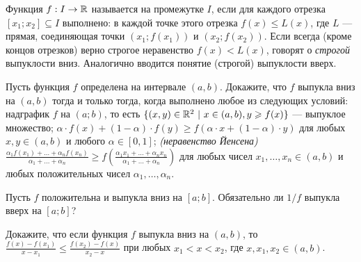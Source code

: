 \documentclass[a4paper, 12pt]{article}
\newcommand{\0}[1]{\overline{#1}}
\begin{document}






 Функция $f:I\rightarrow\mathbb{R}$
называется  на промежутке $I$, если для каждого отрезка
$[x_1;x_2]\subseteq I$ выполнено: в каждой точке этого отрезка $f(x)\leqslant L(x)$, где $L$ --- прямая,
соединяющая точки $(x_1;f(x_1))$ и $(x_2;f(x_2))$.
Если всегда (кроме концов отрезков) верно строгое неравенство $f(x)<L(x)$, говорят о {\em строгой} выпуклости вниз.
Аналогично вводится понятие (строгой) выпуклости вверх.

 Пусть функция $f$ определена на интервале $(a,b)$.
Докажите, что $f$ выпукла вниз на $(a,b)$ тогда и только тогда, когда выполнено любое из следующих условий:
надграфик $f$ на $(a;b)$,
то есть $\{(x,y)\in\R^2\ |\ x\in(a,b),y\geqslant f(x)\}$
--- выпуклое множество;
$\alpha\cdot f(x)+(1-\alpha)\cdot f(y)\geqslant
f(\alpha\cdot x+(1-\alpha)\cdot y)$
для любых $x,y\in(a,b)$ и любого $\alpha\in[0,1]$;
{\it (неравенство Йенсена)}
$%
\frac{\alpha_1 f(x_1)+\dots+\alpha_n f(x_n)}{\alpha_1+\dots+\alpha_n}
\geqslant
f\left(\frac{\alpha_1 x_1+\dots+\alpha_n x_n}{\alpha_1+\dots+\alpha_n}\right)
$
для любых чисел
$x_1,\dots,x_n\in(a,b)$ и любых положительных чисел
$\alpha_1,\dots,\alpha_n$.


Пусть $f$ положительна и выпукла вниз на $[a;b]$.
Обязательно ли $1/f$ выпукла вверх на $[a;b]$?



Докажите, что если функция $f$ выпукла вниз на $(a,b)$, то %
$\frac{f(x)-f(x_1)}{x-x_1} \leq \frac{f(x_2)-f(x)}{x_2-x}$ при любых $x_1 < x < x_2$, где $x,x_1,x_2 \in (a,b)$.
\end{document}
